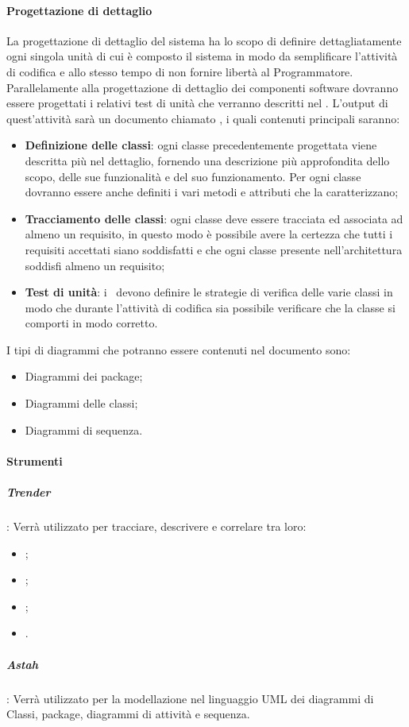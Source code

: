 \documentclass[../NormeDiProgetto_v3.0.0.tex]{subfiles}
\begin{document}
		\paragraph{Progettazione di dettaglio}
			La progettazione di dettaglio del sistema ha lo scopo di
			definire dettagliatamente ogni singola unità di cui è composto il sistema in modo da semplificare
			l'attività di codifica e allo stesso tempo di non fornire libertà al Programmatore.
			Parallelamente alla progettazione di dettaglio dei componenti software dovranno essere progettati
			i relativi test di unità che verranno descritti nel \pianodiqualifica.
			L'output di quest'attività sarà un documento chiamato , i quali contenuti principali saranno:
			\begin{itemize}
				\item \textbf{Definizione delle classi}: ogni classe precedentemente progettata viene descritta più nel
				dettaglio, fornendo una descrizione più approfondita dello scopo, delle sue funzionalità e del
				suo funzionamento. Per ogni classe dovranno essere anche definiti i vari metodi e attributi
				che la caratterizzano;
				\item \textbf{Tracciamento delle classi}: ogni classe deve essere tracciata ed associata ad almeno un
				requisito, in questo modo è possibile avere la certezza che tutti i requisiti accettati siano
				soddisfatti e che ogni classe presente nell'architettura soddisfi almeno un requisito;
				\item \textbf{Test di unità}: i \progettisti\ devono definire le strategie di verifica delle varie classi in modo
				che durante l'attività di codifica sia possibile verificare che la classe si comporti in modo
				corretto.
			\end{itemize}

			I tipi di diagrammi che potranno essere contenuti nel documento sono:
			\begin{itemize}
				\item Diagrammi dei package;
				\item Diagrammi delle classi;
				\item Diagrammi di sequenza.
			\end{itemize}

		\paragraph{Strumenti}
			\subparagraph{Trender}: Verrà utilizzato per tracciare, descrivere e correlare tra loro:
					\begin{itemize}
						\item {};
						\item {};
						\item {};
						\item {}.
					\end{itemize}
			\subparagraph{Astah}: Verrà utilizzato per la modellazione nel linguaggio UML dei diagrammi di Classi, package, diagrammi di attività e sequenza.
		
\end{document}
